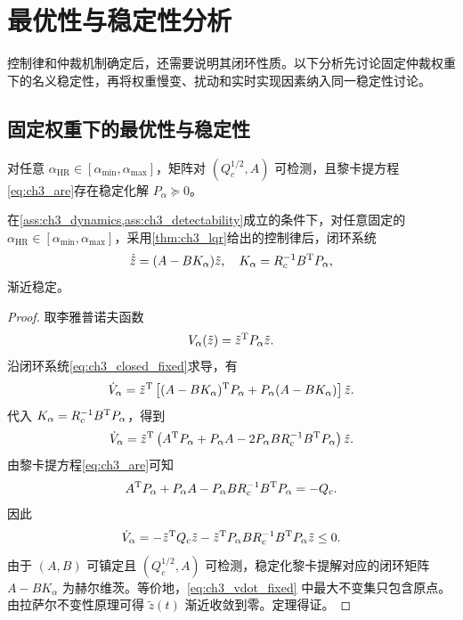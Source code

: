 \section{最优性与稳定性分析}
\label{sec:ch3_theory}

控制律和仲裁机制确定后，还需要说明其闭环性质。以下分析先讨论固定仲裁权重下的名义稳定性，再将权重慢变、扰动和实时实现因素纳入同一稳定性讨论。

\subsection{固定权重下的最优性与稳定性}
\label{subsec:ch3_fixed_theory}

\begin{assumption}[可检测性与稳定化解]
\label{ass:ch3_detectability}
对任意 $\alpha_{\mathrm{HR}}\in[\alpha_{\min},\alpha_{\max}]$，矩阵对 $(Q_c^{1/2},A)$ 可检测，且黎卡提方程\eqref{eq:ch3_are}存在稳定化解 $P_\alpha\succeq0$。
\end{assumption}

\begin{theorem}[固定仲裁参数下的闭环稳定性]
\label{thm:ch3_fixed_stability}
在\cref{ass:ch3_dynamics,ass:ch3_detectability}成立的条件下，对任意固定的 $\alpha_{\mathrm{HR}}\in[\alpha_{\min},\alpha_{\max}]$，采用\cref{thm:ch3_lqr}给出的控制律后，闭环系统
\begin{equation}
  \dot{\tilde z}=(A-BK_\alpha)\tilde z,
  \quad K_\alpha=R_c^{-1}B^{\mathrm{T}}P_\alpha,
  \label{eq:ch3_closed_fixed}
\end{equation}
渐近稳定。
\end{theorem}

\begin{proof}
取李雅普诺夫函数
\begin{equation}
  V_\alpha(\tilde z)=\tilde z^{\mathrm{T}}P_\alpha\tilde z .
\end{equation}
沿闭环系统\eqref{eq:ch3_closed_fixed}求导，有
\begin{equation}
  \dot V_\alpha=\tilde z^{\mathrm{T}}\left[(A-BK_\alpha)^{\mathrm{T}}P_\alpha+P_\alpha(A-BK_\alpha)\right]\tilde z .
\end{equation}
代入 $K_\alpha=R_c^{-1}B^{\mathrm{T}}P_\alpha$，得到
\begin{equation}
  \dot V_\alpha=\tilde z^{\mathrm{T}}\left(A^{\mathrm{T}}P_\alpha+P_\alpha A-2P_\alpha BR_c^{-1}B^{\mathrm{T}}P_\alpha\right)\tilde z .
\end{equation}
由黎卡提方程\eqref{eq:ch3_are}可知
\begin{equation}
  A^{\mathrm{T}}P_\alpha+P_\alpha A-P_\alpha BR_c^{-1}B^{\mathrm{T}}P_\alpha=-Q_c .
\end{equation}
因此
\begin{equation}
  \dot V_\alpha=-\tilde z^{\mathrm{T}}Q_c\tilde z-\tilde z^{\mathrm{T}}P_\alpha BR_c^{-1}B^{\mathrm{T}}P_\alpha\tilde z\le0 .
  \label{eq:ch3_vdot_fixed}
\end{equation}
由于 $(A,B)$ 可镇定且 $(Q_c^{1/2},A)$ 可检测，稳定化黎卡提解对应的闭环矩阵 $A-BK_\alpha$ 为赫尔维茨。等价地，\eqref{eq:ch3_vdot_fixed} 中最大不变集只包含原点。由拉萨尔不变性原理可得 $\tilde z(t)$ 渐近收敛到零。定理得证。
\end{proof}


